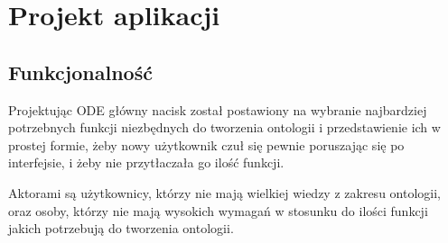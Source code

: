 \documentclass[a4paper,12pt, twoside]{book} %
\begin{document}
	\begin{table}[!h]
	\end{table}

\section{Projekt aplikacji}
\subsection{Funkcjonalność}
Projektując ODE główny nacisk został postawiony na wybranie najbardziej potrzebnych funkcji niezbędnych do tworzenia ontologii i przedstawienie ich w prostej formie, żeby nowy użytkownik czuł się pewnie poruszając się po interfejsie, i żeby nie przytłaczała go ilość funkcji.

Aktorami są użytkownicy, którzy nie mają wielkiej wiedzy z zakresu ontologii, oraz osoby, którzy nie mają wysokich wymagań w stosunku do ilości funkcji jakich potrzebują do tworzenia ontologii.
\end{document}
